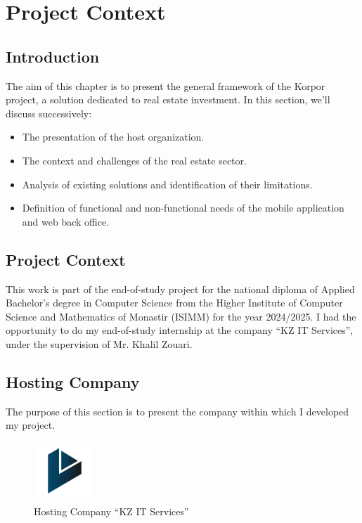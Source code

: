 \chapter{Project Context}

\section{Introduction}

The aim of this chapter is to present the general framework of the Korpor project, a solution dedicated to real estate investment. In this section, we'll discuss successively:

\begin{itemize}
    \item The presentation of the host organization.
    \item The context and challenges of the real estate sector.
    \item Analysis of existing solutions and identification of their limitations.
    \item Definition of functional and non-functional needs of the mobile application and web back office.
\end{itemize}

\section{Project Context}

This work is part of the end-of-study project for the national diploma of Applied Bachelor's degree in Computer Science from the Higher Institute of Computer Science and Mathematics of Monastir (ISIMM) for the year 2024/2025. I had the opportunity to do my end-of-study internship at the company
``KZ IT Services'', under the supervision of Mr. Khalil Zouari.

\section{Hosting Company}

The purpose of this section is to present the company within which I developed my project.

\begin{figure}[htbp]
    \centering
    \includegraphics[width=0.2\textwidth]{images/company-logo.png}
    \caption{Hosting Company ``KZ IT Services''}
    \label{fig:hosting-company}
\end{figure}

